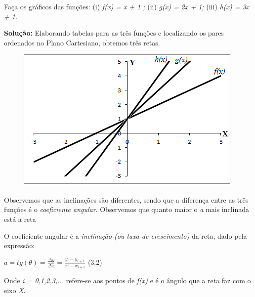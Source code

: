\begin{texemplo}
Faça os gráficos das funções: (i)  \textit{ f(x) = x + 1  ;  }(ii) \textit{ g(x) = 2x + 1; }(iii) \textit{h(x) = 3x + 1.}

\textbf{Solução:} Elaborando tabelas para as três funções e localizando os pares ordenados no Plano Cartesiano, obtemos três retas.  

\begin{figure}[H]
	\begin{Center}
		\includegraphics[width=4.38in,height=2.77in]{capitulos/funcao_do_primeiro_grau/media/image9.png}
	\end{Center}
\end{figure}

Observemos que as inclinações são diferentes, sendo que a diferença entre as três funções é o \textit{coeficiente angular}. Observemos que quanto maior o \textit{a} mais inclinada está a reta \qedsymbol{}
\end{texemplo}

\begin{caixa}
O coeficiente angular é a \textit{inclinação (ou taxa de crescimento)} da reta, dado pela expressão:

\begin{FlushRight}
 \( a=tg \left(  \theta  \right) =\frac{ \Delta y}{ \Delta x}=\frac{y_{i}-y_{i+1}}{x_{i}-x_{i+1}} \) \tab (3.2)
\end{FlushRight}

Onde \textit{i = 0,1,2,3,...} refere-se aos pontos de \textit{f(x)} e  é o ângulo que a reta faz com o eixo \textit{X}.
\end{caixa}

